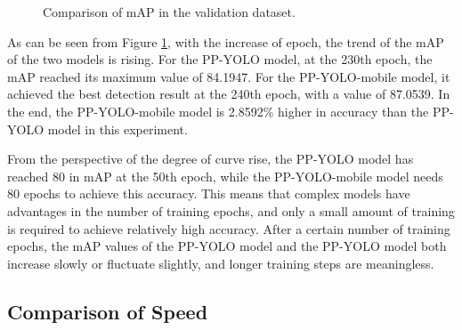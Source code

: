 \documentclass[sensors,article,submit,moreauthors,pdftex]{Definitions/mdpi}
\begin{document}
\begin{paracol}{2}
\begin{figure}[htbp]
\centering
{}
\quad
{}
\caption{Comparison of mAP in the validation dataset.}
\label{fig:map}
\end{figure}

As can be seen from Figure \ref{fig:map}, with the increase of epoch, the trend of the mAP of the two models is rising. For the PP-YOLO model, at the 230th epoch, the mAP reached its maximum value of 84.1947. For the PP-YOLO-mobile model, it achieved the best detection result at the 240th epoch, with a value of 87.0539. In the end, the PP-YOLO-mobile model is 2.8592\% higher in accuracy than the PP-YOLO model in this experiment.



From the perspective of the degree of curve rise, the PP-YOLO model has reached 80 in mAP at the 50th epoch, while the PP-YOLO-mobile model needs 80 epochs to achieve this accuracy. This means that complex models have advantages in the number of training epochs, and only a small amount of training is required to achieve relatively high accuracy. After a certain number of training epochs, the mAP values of the PP-YOLO model and the PP-YOLO model both increase slowly or fluctuate slightly, and longer training steps are meaningless.



\subsection{Comparison of Speed}


\end{paracol}
\end{document}
